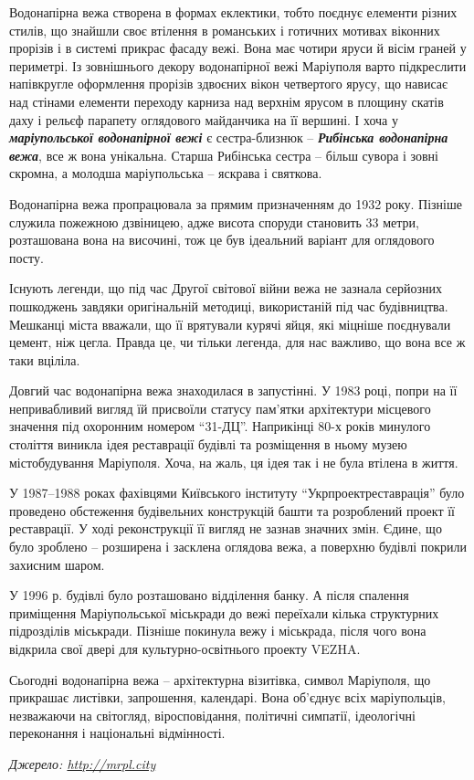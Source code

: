 Водонапірна вежа створена в формах еклектики, тобто поєднує елементи різних
стилів, що знайшли своє втілення в романських і готичних мотивах віконних
прорізів і в системі прикрас фасаду вежі. Вона має чотири яруси й вісім граней
у периметрі. Із зовнішнього декору водонапірної вежі Маріуполя варто
підкреслити напівкругле оформлення прорізів здвоєних вікон четвертого ярусу, що
нависає над стінами елементи переходу карниза над верхнім ярусом в площину
скатів даху і рельєф парапету оглядового майданчика на її вершині. І хоча у
\emph{\textbf{маріупольської водонапірної вежі}} є сестра-близнюк – \emph{\textbf{Рибінська водонапірна вежа}},
все ж вона унікальна. Старша Рибінська сестра – більш сувора і зовні скромна, а
молодша маріупольська – яскрава і святкова. 

Водонапірна вежа пропрацювала за прямим призначенням до 1932 року. Пізніше
служила пожежною дзвіницею, адже висота споруди становить 33 метри, розташована
вона на височині, тож це був ідеальний варіант для оглядового посту.

Існують легенди, що під час Другої світової війни вежа не зазнала серйозних
пошкоджень завдяки оригінальній методиці, використаній під час будівництва.
Мешканці міста вважали, що її врятували курячі яйця, які міцніше поєднували
цемент, ніж цегла. Правда це, чи тільки легенда, для нас важливо, що вона все ж
таки вціліла.


Довгий час водонапірна вежа знаходилася в запустінні. У 1983 році, попри на її
непривабливий вигляд їй присвоїли статусу пам'ятки архітектури місцевого
значення під охоронним номером \enquote{31-ДЦ}. Наприкінці 80-х років минулого століття
виникла ідея реставрації будівлі та розміщення в ньому музею містобудування
Маріуполя. Хоча, на жаль, ця ідея так і не була втілена в життя.

У 1987–1988 роках фахівцями Київського інституту \enquote{Укрпроектреставрація} було
проведено обстеження будівельних конструкцій башти та розроблений проект її
реставрації. У ході реконструкції її вигляд не зазнав значних змін. Єдине, що
було зроблено – розширена і засклена оглядова вежа, а поверхню будівлі покрили
захисним шаром.

У 1996 р. будівлі було розташовано відділення банку. А після спалення
приміщення Маріупольської міськради до вежі переїхали кілька структурних
підрозділів міськради. Пізніше покинула вежу і міськрада, після чого вона
відкрила свої двері для культурно-освітнього проекту VEZHA.


Сьогодні водонапірна вежа – архітектурна візитівка, символ Маріуполя, що
прикрашає листівки, запрошення, календарі. Вона об'єднує всіх маріупольців,
незважаючи на світогляд, віросповідання, політичні симпатії, ідеологічні
переконання і національні відмінності.

\emph{Джерело: \url{http://mrpl.city}}

